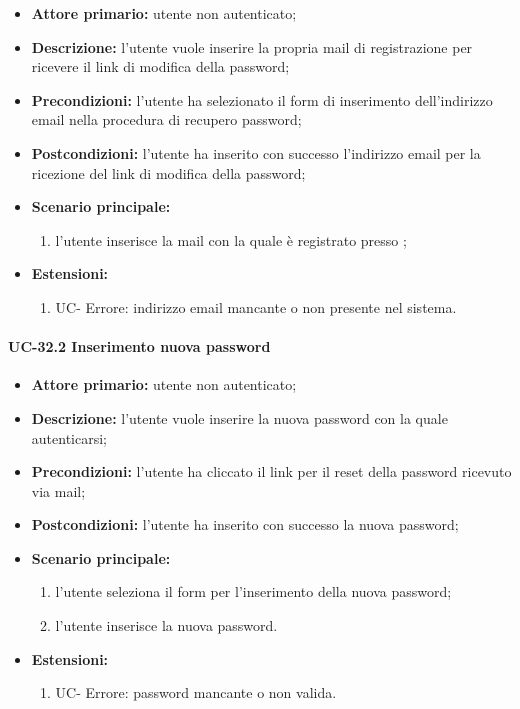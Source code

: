 	\begin{itemize}
		\item \textbf{Attore primario:} utente non autenticato;

		\item \textbf{Descrizione:} l'utente vuole inserire la propria mail di registrazione per ricevere il link di modifica della password;

		\item \textbf{Precondizioni:} l'utente ha selezionato il form di inserimento dell'indirizzo email nella procedura di recupero password;

		\item \textbf{Postcondizioni:} l'utente ha inserito con successo l'indirizzo email per la ricezione del link di modifica della password;

		\item \textbf{Scenario principale:}
	  		\begin{enumerate}
		  		\item l'utente inserisce la mail con la quale è registrato presso ; 
	  		\end{enumerate}
	  	\item \textbf{Estensioni:}
	  		\begin{enumerate}
		  		\item UC- Errore: indirizzo email mancante o non presente nel sistema.
	  		\end{enumerate}
		\end{itemize}

\paragraph{UC-32.2 Inserimento nuova password}

	\begin{itemize}
		\item \textbf{Attore primario:} utente non autenticato;

		\item \textbf{Descrizione:} l'utente vuole inserire la nuova password con la quale autenticarsi;

		\item \textbf{Precondizioni:} l'utente ha cliccato il link per il reset della password ricevuto via mail;

		\item \textbf{Postcondizioni:} l'utente ha inserito con successo la nuova password;

		\item \textbf{Scenario principale:}
	  		\begin{enumerate}
		  		\item l'utente seleziona il form per l'inserimento della nuova password;
		  		\item l'utente inserisce la nuova password.
	  		\end{enumerate}
	  	\item \textbf{Estensioni:}
	  		\begin{enumerate}
		  		\item UC- Errore: password mancante o non valida.
	  		\end{enumerate}
	\end{itemize}

